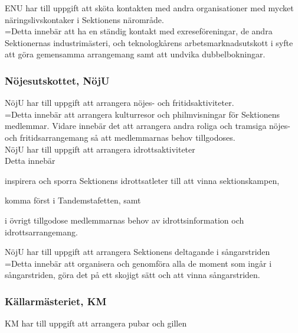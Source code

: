 \documentclass[10pt]{article}
\begin{document}
\noindent ENU har till uppgift att sköta kontakten med andra organisationer
med mycket näringslivskontaker i Sektionens närområde. \\

\hangindent=\parindent Detta innebär att ha en ständig kontakt med
exreseföreningar, de andra Sektionernas industrimästeri, och teknologkårens
arbetsmarknadsutskott i syfte att göra gemensamma arrangemang samt att
undvika dubbelbokningar.

\subsubsection{Nöjesutskottet, NöjU}

NöjU har till uppgift att arrangera nöjes- och fritidsaktiviteter. \\

\hangindent=\parindent Detta innebär att arrangera kulturresor och
philmvisningar för Sektionens medlemmar. Vidare innebär det att arrangera
andra roliga och tramsiga nöjes- och fritidsarrangemang så att medlemmarnas
behov tillgodoses. \\

\noindent NöjU har till uppgift att arrangera idrottsaktiviteter \\

Detta innebär
\begin{attlist}
    \item inspirera och sporra Sektionens idrottsatleter till att vinna
        sektionskampen,
    \item komma först i Tandemstafetten, samt
    \item i övrigt tillgodose medlemmarnas behov av idrottsinformation och
        idrottsarrangemang.
\end{attlist}

\noindent NöjU har till uppgift att arrangera Sektionens deltagande i
sångarstriden \\

\hangindent=\parindent Detta innebär att organisera och genomföra alla
de moment som ingår i sångarstriden, göra det på ett skojigt sätt och att
vinna sångarstriden.

\subsubsection{Källarmästeriet, KM}

KM har till uppgift att arrangera pubar och gillen \\
\end{document}
